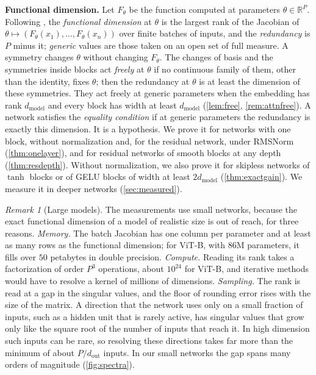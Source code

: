 \documentclass[10pt]{article}
\theoremstyle{definition}
\theoremstyle{remark}
\newtheorem{remark}[theorem]{Remark}
\newcommand{\R}{\mathbb{R}}
\newcommand{\dm}{d_{\mathrm{model}}}
\newcommand{\para}[1]{\smallskip\noindent\textbf{#1}\hspace{0.5em}}
\begin{document}
\para{Functional dimension.} Let $F_\theta$ be the function computed at parameters $\theta \in \R^P$. Following \citet{grigsby2022functional}, the \emph{functional dimension} at $\theta$ is the largest rank of the Jacobian of $\theta \mapsto (F_\theta(x_1), \dots, F_\theta(x_n))$ over finite batches of inputs, and the \emph{redundancy} is $P$ minus it; \emph{generic} values are those taken on an open set of full measure. A symmetry changes $\theta$ without changing $F_\theta$. The changes of basis and the symmetries inside blocks act \emph{freely} at $\theta$ if no continuous family of them, other than the identity, fixes $\theta$; then the redundancy at $\theta$ is at least the dimension of these symmetries. They act freely at generic parameters when the embedding has rank $\dm$ and every block has width at least $\dm$ (\cref{lem:free}, \cref{rem:attnfree}). A network satisfies the \emph{equality condition} if at generic parameters the redundancy is exactly this dimension. It is a hypothesis. We prove it for networks with one block, without normalization and, for the residual network, under RMSNorm (\cref{thm:onelayer}), and for residual networks of smooth blocks at any depth (\cref{thm:resdepth}). Without normalization, we also prove it for skipless networks of $\tanh$ blocks or of GELU blocks of width at least $2\dm$ (\cref{thm:exactgain}). We measure it in deeper networks (\cref{sec:measured}).

\begin{remark}[Large models]\label{rem:largefd}
The measurements use small networks, because the exact functional dimension of a model of realistic size is out of reach, for three reasons. \emph{Memory.} The batch Jacobian has one column per parameter and at least as many rows as the functional dimension; for ViT-B, with $86$M parameters, it fills over $50$ petabytes in double precision. \emph{Compute.} Reading its rank takes a factorization of order $P^3$ operations, about $10^{24}$ for ViT-B, and iterative methods would have to resolve a kernel of millions of dimensions. \emph{Sampling.} The rank is read at a gap in the singular values, and the floor of rounding error rises with the size of the matrix. A direction that the network uses only on a small fraction of inputs, such as a hidden unit that is rarely active, has singular values that grow only like the square root of the number of inputs that reach it. In high dimension such inputs can be rare, so resolving these directions takes far more than the minimum of about $P/d_{\mathrm{out}}$ inputs. In our small networks the gap spans many orders of magnitude (\cref{fig:spectra}).
\end{remark}
\end{document}
